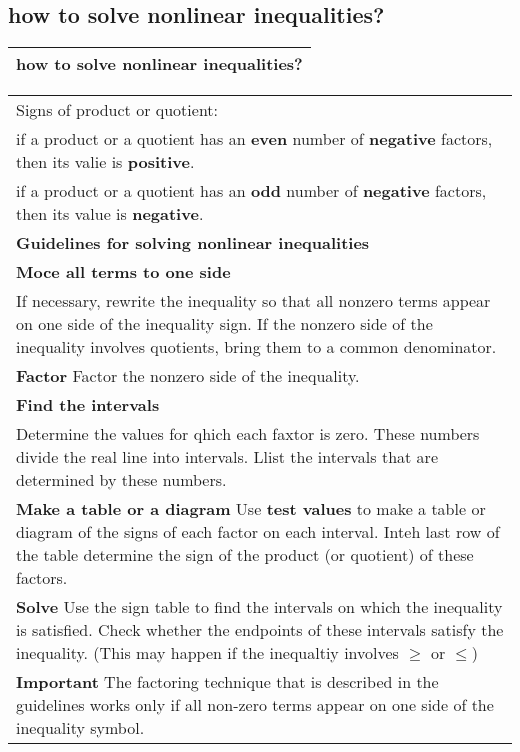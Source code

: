 \subsection{
how to solve nonlinear inequalities?}
\begin{small}
    \begin{tabularx}{1\textwidth}{
            p{}
        }
        \toprule
        how to solve nonlinear inequalities?
        \\
        \bottomrule
    \end{tabularx}
\end{small}
\begin{small}
    \begin{tabularx}{1\textwidth}{
            p{}
        }
        \toprule
        Signs of product or quotient: \\
        if a product or a quotient has an \textbf{even} number of
        \textbf{negative} factors, then its valie is \textbf{positive}. \\
        if a product or a quotient has an \textbf{odd} number of
        \textbf{negative} factors, then its value is \textbf{negative}.
        \\
        \midrule
        \textbf{Guidelines for solving nonlinear inequalities}\\
        \textbf{Moce all terms to one side}\\
        If necessary, rewrite the inequality so that all nonzero terms appear on
        one side of the inequality sign. If the nonzero side of the inequality
        involves quotients, bring them to a common denominator.\\
        \textbf{Factor} Factor the nonzero side of the inequality. \\
        \textbf{Find the intervals}\\
        Determine the values for qhich each faxtor is zero. These numbers divide
        the real line into intervals. Llist the intervals that are determined by
        these numbers.\\
        \textbf{Make a table or a diagram} Use \textbf{test values} to make a
        table or diagram of the signs of each factor on each interval. Inteh
        last row of the table determine the sign of the product (or quotient) of
        these factors.\\
        \textbf{Solve} Use the sign table to find the intervals on which the
        inequality is satisfied. Check whether the endpoints of these intervals
        satisfy the inequality. (This may happen if the inequaltiy involves
        $\geq \text{ or } \leq $)
        \\
        \midrule
        \textbf{Important} The factoring technique that is described in the
        guidelines works only if all non-zero terms appear on one side of the
        inequality symbol.
        \\
        \bottomrule
    \end{tabularx}
\end{small}
